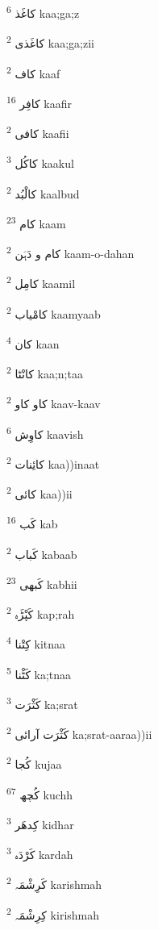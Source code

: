 \documentclass[12pt]{article}
\begin{document}
\begin{RTL}
\begin{multicols}{5}
{\ur کاغَذ}   \textsuperscript{6} kaa;ga;z

{\ur کاغَذی}   \textsuperscript{2} kaa;ga;zii

{\ur کاف}   \textsuperscript{2} kaaf

{\ur کافِر}   \textsuperscript{16} kaafir

{\ur کافی}   \textsuperscript{2} kaafii

{\ur کاکُل}   \textsuperscript{3} kaakul

{\ur کالْبُد}   \textsuperscript{2} kaalbud

{\ur کام}   \textsuperscript{23} kaam

{\ur کام و دَہَن}   \textsuperscript{2} kaam-o-dahan

{\ur کامِل}   \textsuperscript{2} kaamil

{\ur کامْیاب}   \textsuperscript{2} kaamyaab

{\ur کان}   \textsuperscript{4} kaan

{\ur کانْٹا}   \textsuperscript{2} kaa;n;taa

{\ur کاو کاو}   \textsuperscript{2} kaav-kaav

{\ur کاوِش}   \textsuperscript{6} kaavish

{\ur کائِنات}   \textsuperscript{2} kaa))inaat

{\ur کائی}   \textsuperscript{2} kaa))ii

{\ur کَب}   \textsuperscript{16} kab

{\ur کَباب}   \textsuperscript{2} kabaab

{\ur کَبھی}   \textsuperscript{23} kabhii

{\ur کَپْڑَہ}   \textsuperscript{2} kap;rah

{\ur کِتْنا}   \textsuperscript{4} kitnaa

{\ur کَٹْنا}   \textsuperscript{5} ka;tnaa

{\ur کَثْرَت}   \textsuperscript{3} ka;srat

{\ur کَثْرَت آرائی}   \textsuperscript{2} ka;srat-aaraa))ii

{\ur کُجا}   \textsuperscript{2} kujaa

{\ur کُچھ}   \textsuperscript{67} kuchh

{\ur کِدھَر}   \textsuperscript{3} kidhar

{\ur کَرْدَہ}   \textsuperscript{3} kardah

{\ur کَرِشْمَہ}   \textsuperscript{2} karishmah

{\ur کِرِشْمَہ}   \textsuperscript{2} kirishmah


\end{multicols}
\end{RTL}
\end{document}
